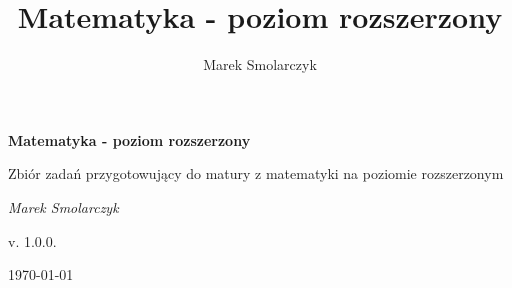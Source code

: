 \documentclass[a4paper,12pt]{book}
\begin{document}
\frontmatter

\begin{titlepage}
	\centering
	{ \bfseries \LARGE Matematyka - poziom rozszerzony \par }
	\vspace{1cm}
	{ \large Zbiór zadań przygotowujący do matury z matematyki na poziomie rozszerzonym \par }
	\vspace{3cm}
	{ \itshape \large Marek Smolarczyk \par }
	\vfill
	{ \large v. 1.0.0. \par }
	\vspace{0.2cm}
	{ \large \today \par }
\end{titlepage}

\author{Marek Smolarczyk}
\title{Matematyka - poziom rozszerzony}

\tableofcontents

\mainmatter


\backmatter
\end{document}

